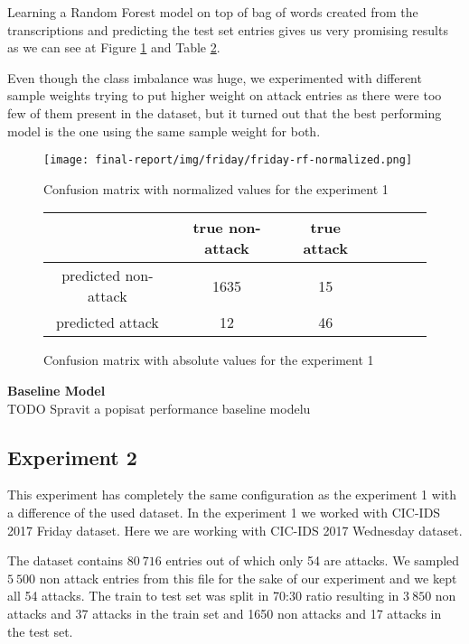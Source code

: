 \documentclass{article}
\begin{document}
Learning a Random Forest model on top of bag of words created from the transcriptions and predicting the test set entries gives us very promising results as we can see at Figure \ref{fig-friday-rf-normalized} and Table \ref{tab-friday-rf-absolute}.

Even though the class imbalance was huge, we experimented with different sample weights trying to put higher weight on attack entries as there were too few of them present in the dataset, but it turned out that the best performing model is the one using the same sample weight for both.

\begin{figure}[h!]
    \centering
    \texttt{[image: final-report/img/friday/friday-rf-normalized.png]}
    \caption{Confusion matrix with normalized values for the experiment 1}
    \label{fig-friday-rf-normalized}
\end{figure}

\begin{figure}[h!]
\centering
\begin{tabular}{ |c|c|c|c|c|c|c| }
 \hline
  & true non-attack & true attack \\
 \hline
 predicted non-attack & 1635 & 15 \\
 \hline
 predicted attack & 12 & 46 \\
 \hline
\end{tabular}
\caption{Confusion matrix with absolute values for the experiment 1}
\label{tab-friday-rf-absolute}
\end{figure}

\textbf{Baseline Model}\\
TODO Spravit a popisat performance baseline modelu\\





\subsection{Experiment 2}
This experiment has completely the same configuration as the experiment 1 with a difference of the used dataset. In the experiment 1 we worked with CIC-IDS 2017 Friday dataset. Here we are working with CIC-IDS 2017 Wednesday dataset.

The dataset contains $80\ 716$ entries out of which only 54 are attacks. We sampled $5\ 500$ non attack entries from this file for the sake of our experiment and we kept all 54 attacks. The train to test set was split in 70:30 ratio resulting in $3\ 850$ non attacks and 37 attacks in the train set and 1650 non attacks and 17 attacks in the test set.
\end{document}

